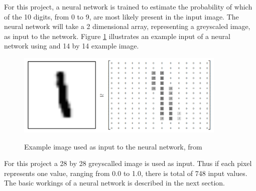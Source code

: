For this project, a neural network is trained to estimate the probability of which of the 10 digits, from 0 to 9, are most likely present in the input image. The neural network will take a 2 dimensional array, representing a greyscaled image, as input to the network. Figure \ref{fig:mnist} illustrates an example input of a neural network using and 14 by 14 example image. 

\begin{figure}
  \centering
  \includegraphics[width=10cm]{MNIST}\\
  \caption{Example image used as input to the neural network, from \citet{tensor2017}}
  \label{fig:mnist}
\end{figure}

For this project a 28 by 28 greyscalled image is used as input. Thus if each pixel represents one value, ranging from 0.0 to 1.0, there is total of 748 input values. The basic workings of a neural network is described in the next section.


